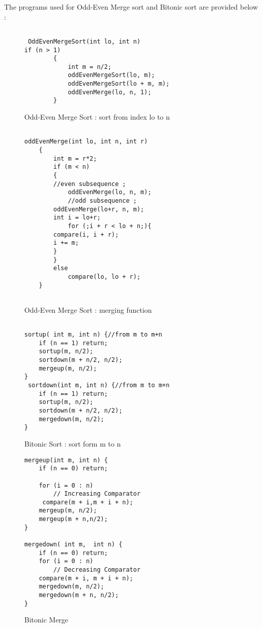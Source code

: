 \documentclass{acm_proc_article-sp}
\begin{document}
 The programs used for Odd-Even Merge sort and Bitonic sort are provided below : 


\begin{figure}[h]
\begin{lstlisting}[label = oesort ]

 OddEvenMergeSort(int lo, int n)
if (n > 1)
        {
            int m = n/2;
            oddEvenMergeSort(lo, m);
            oddEvenMergeSort(lo + m, m);
            oddEvenMerge(lo, n, 1);
        }

\end{lstlisting}
\caption{Odd-Even Merge Sort : sort from index lo to n }
\end{figure}


\begin{figure}
\begin{lstlisting}[label = oemerge ]

oddEvenMerge(int lo, int n, int r)
    {
        int m = r*2;
        if (m < n)
        {
	    //even subsequence ;		
            oddEvenMerge(lo, n, m); 
            //odd subsequence ;
	    oddEvenMerge(lo+r, n, m); 
	    int i = lo+r;   
            for (;i + r < lo + n;){
		compare(i, i + r);
		i += m;
	    }
        }
        else
            compare(lo, lo + r);
    }


\end{lstlisting} 
\caption{Odd-Even Merge Sort : merging function}
\end{figure}

\begin{figure}
\begin{lstlisting}[label=bitsort]

sortup( int m, int n) {//from m to m+n
    if (n == 1) return;
    sortup(m, n/2);
    sortdown(m + n/2, n/2);
    mergeup(m, n/2);
}
 sortdown(int m, int n) {//from m to m+n
    if (n == 1) return;
    sortup(m, n/2);
    sortdown(m + n/2, n/2);
    mergedown(m, n/2);
}
\end{lstlisting}
\caption{Bitonic Sort : sort form m to n}
\end{figure}

\begin{figure}[t]
\begin{lstlisting}[label=bitmerge]
mergeup(int m, int n) {  
    if (n == 0) return;
    
    for (i = 0 : n)
        // Increasing Comparator
	 compare(m + i,m + i + n);
    mergeup(m, n/2);
    mergeup(m + n,n/2);
}

mergedown( int m,  int n) { 
    if (n == 0) return;
    for (i = 0 : n) 
        // Decreasing Comparator
	compare(m + i, m + i + n); 
    mergedown(m, n/2);
    mergedown(m + n, n/2);
}
\end{lstlisting}
\caption{Bitonic Merge} 
\end{figure} 


%
%
\balancecolumns
\end{document}
